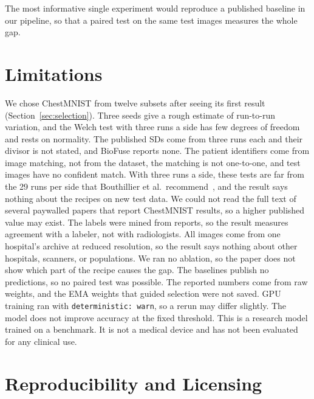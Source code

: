 \documentclass[conference]{IEEEtran}
\newif\ifanycitation
\let\citeAnyKey\cite
\renewcommand{\cite}{\global\anycitationtrue\citeAnyKey}
\begin{document}
The most informative single experiment would reproduce a published baseline in our
pipeline, so that a paired test on the same test images measures the whole gap.

\section{Limitations}
\label{sec:limits}

We chose ChestMNIST from twelve subsets after seeing its first result
(Section~\ref{sec:selection}). Three seeds give a rough estimate of run-to-run variation,
and the Welch test with three runs a side has few degrees of freedom and rests on
normality. The published SDs come from three runs each and their divisor is not stated,
and BioFuse reports none. The patient identifiers
come from image matching, not from the dataset, the matching is not one-to-one, and
\unmatchedTest{} test images have no confident match. With three runs a side, these tests
are far from the 29 runs per side that Bouthillier et al.\ recommend~\cite{bouthillier2021variance},
and the result says nothing about the recipes on new test data. We could not read the full
text of several paywalled papers that report ChestMNIST results, so a higher published
value may exist. The labels were mined
from reports, so the result measures agreement with a labeler, not with radiologists. All
images come from one hospital's archive at reduced resolution, so the result says nothing
about other hospitals, scanners, or populations. We ran no ablation, so the paper does not
show which part of the recipe causes the gap. The baselines publish no predictions, so no
paired test was possible. The reported numbers come from raw weights, and the EMA weights
that guided selection were not saved. GPU training ran with \texttt{deterministic: warn},
so a rerun may differ slightly. The model does not improve accuracy at the fixed threshold.
This is a research model trained on a benchmark. It is not a medical device and has not
been evaluated for any clinical use.

\section{Reproducibility and Licensing}
\label{sec:repro}
\end{document}

